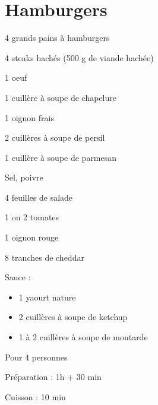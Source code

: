 \section[\normalsize{Hamburgers}]{Hamburgers}

\begin{ingredients}
\item 4 grands pains \`a hamburgers
\item 4 steaks hach\'es (500 g de viande hach\'ee)
\item 1 oeuf
\item 1 cuill\`ere \`a soupe de chapelure
\item 1 oignon frais
\item 2 cuill\`eres \`a soupe de persil
\item 1 cuill\`ere \`a soupe de parmesan
\item Sel, poivre
\item 4 feuilles de salade
\item 1 ou 2 tomates
\item 1 oignon rouge
\item 8 tranches de cheddar
\item Sauce :
\begin{itemize}
\item 1 yaourt nature
\item 2 cuill\`eres \`a soupe de ketchup
\item 1 \`a 2 cuill\`eres \`a soupe de moutarde
\end{itemize}
\end{ingredients}
\begin{infos}
\item Pour 4 personnes
\item Préparation : 1h + 30 min
\item Cuisson : 10 min
\end{infos}
